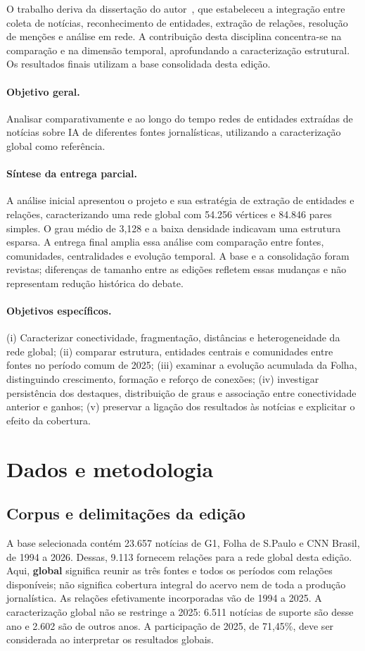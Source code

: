 \documentclass[11pt,a4paper]{article}
\begin{document}
O trabalho deriva da dissertação do autor~\cite{godoy2026}, que estabeleceu a integração entre coleta de notícias, reconhecimento de entidades, extração de relações, resolução de menções e análise em rede. A contribuição desta disciplina concentra-se na comparação e na dimensão temporal, aprofundando a caracterização estrutural. Os resultados finais utilizam a base consolidada desta edição.

\paragraph{Objetivo geral.} Analisar comparativamente e ao longo do tempo redes de entidades extraídas de notícias sobre IA de diferentes fontes jornalísticas, utilizando a caracterização global como referência.

\paragraph{Síntese da entrega parcial.} A análise inicial apresentou o projeto e sua estratégia de extração de entidades e relações, caracterizando uma rede global com 54.256 vértices e 84.846 pares simples. O grau médio de 3,128 e a baixa densidade indicavam uma estrutura esparsa. A entrega final amplia essa análise com comparação entre fontes, comunidades, centralidades e evolução temporal. A base e a consolidação foram revistas; diferenças de tamanho entre as edições refletem essas mudanças e não representam redução histórica do debate.

\paragraph{Objetivos específicos.} (i) Caracterizar conectividade, fragmentação, distâncias e heterogeneidade da rede global; (ii) comparar estrutura, entidades centrais e comunidades entre fontes no período comum de 2025; (iii) examinar a evolução acumulada da Folha, distinguindo crescimento, formação e reforço de conexões; (iv) investigar persistência dos destaques, distribuição de graus e associação entre conectividade anterior e ganhos; (v) preservar a ligação dos resultados às notícias e explicitar o efeito da cobertura.

\clearpage
\section{Dados e metodologia}
\subsection{Corpus e delimitações da edição}
A base selecionada contém 23.657 notícias de G1, Folha de S.Paulo e CNN Brasil, de 1994 a 2026. Dessas, 9.113 fornecem relações para a rede global desta edição. Aqui, \textbf{global} significa reunir as três fontes e todos os períodos com relações disponíveis; não significa cobertura integral do acervo nem de toda a produção jornalística. As relações efetivamente incorporadas vão de 1994 a 2025. A caracterização global não se restringe a 2025: 6.511 notícias de suporte são desse ano e 2.602 são de outros anos. A participação de 2025, de 71,45\%, deve ser considerada ao interpretar os resultados globais.
\end{document}
